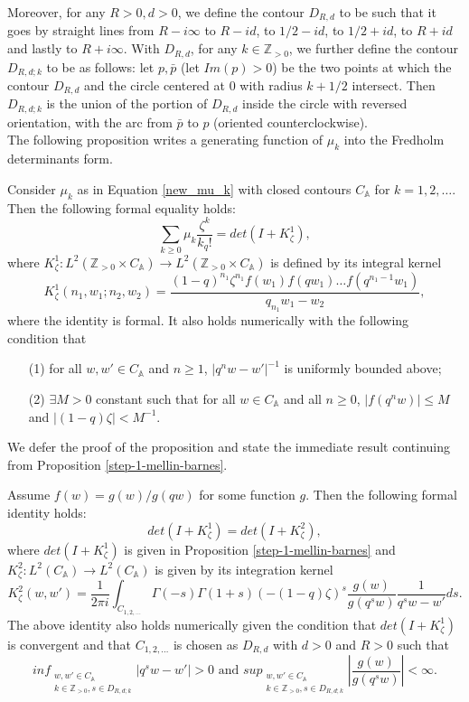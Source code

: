 Moreover, for any $R > 0, d > 0$, we define the contour $D_{R,d}$ to be such that it goes by straight lines from $R - i\infty$ to $R - i d$, to $1/2 - i d$, to $1/2 + id$, to $R + id$ and lastly to $R+i\infty$. With $D_{R,d}$, for any $k \in \mathbb{Z}_{>0}$, we further define the contour $D_{R,d;k}$ to be as follows: let $p, \bar{p}$ (let $Im(p) > 0$) be the two points at which the contour $D_{R,d}$ and the circle centered at 0 with radius $k+1/2$ intersect. Then $D_{R,d;k}$ is the union of the portion of $D_{R,d}$ inside the circle with reversed orientation, with the arc from $\bar{p}$ to $p$ (oriented counterclockwise). \\

The following proposition writes a generating function of $\mu_k$ into the Fredholm determinants form.
\begin{proposition}
\label{step-1-mellin-barnes}
Consider $\mu_k$ as in Equation \ref{new_mu_k} with closed contours $C_{\mathbb{A}}$ for $k = 1,2,\dots$. Then the following formal equality holds:
$$\sum_{k \ge 0} \mu_k \frac{\zeta^k}{k_q!} = det(I+K_{\zeta}^{1}),$$ where $K_{\zeta}^1:L^2(\mathbb{Z}_{>0} \times C_{\mathbb{A}}) \rightarrow L^2(\mathbb{Z}_{>0} \times C_{\mathbb{A}})$ is defined by its integral kernel $$K_{\zeta}^1(n_1, w_1; n_2, w_2)= \frac{(1-q)^{n_1} \zeta^{n_1} f(w_1) f(qw_1) \dots f(q^{n_1-1}w_1)}{q_{n_1}w_1 - w_2},$$
where the identity is formal. It also holds numerically with the following condition that
\begin{enumerate}
\item[(1)] for all $w, w' \in C_{\mathbb{A}}$ and $n \ge 1$, $|q^n w - w'|^{-1}$ is uniformly bounded above;
\item[(2)] $\exists M > 0$ constant such that for all $w \in C_{\mathbb{A}}$ and all $n \ge 0$, $|f(q^n w)| \le M$ and $|(1-q) \zeta| < M^{-1}$.
\end{enumerate}
\end{proposition}

We defer the proof of the proposition and state the immediate result continuing from Proposition \ref{step-1-mellin-barnes}.

\begin{proposition}
\label{step-2-mellin-barnes}
Assume $f(w) = g(w) / g(qw)$ for some function $g$. Then the following formal identity holds:
$$det(I+K_{\zeta}^1) = det(I+K_{\zeta}^2),$$ where $det(I+K_{\zeta}^1)$ is given in Proposition \ref{step-1-mellin-barnes} and $K_{\zeta}^2:L^2(C_{\mathbb{A}}) \rightarrow L^2(C_{\mathbb{A}})$ is given by its integration kernel $$K_{\zeta}^2(w,w') = \frac{1}{2 \pi i} \int_{C_{1,2,\dots}} \Gamma(-s) \Gamma(1+s) (-(1-q)\zeta)^s \frac{g(w)}{g(q^sw)} \frac{1}{q^sw - w'} ds.$$
The above identity also holds numerically given the condition that $det(I+K_{\zeta}^1)$ is convergent and that $C_{1,2,\dots}$ is chosen as $D_{R,d}$ with $d > 0$ and $R > 0$ such that $$ inf_{\substack{ {w, w' \in C_{\mathbb{A}}} \\ {k \in \mathbb{Z}_{>0}, s \in D_{R, d;k}} }} |q^sw - w'| > 0 \text{ and } sup_{\substack{ {w,w' \in C_{\mathbb{A}}} \\ {k \in \mathbb{Z}_{>0}, s \in D_{R,d;k}} }} \left| \frac{g(w)}{g(q^s w)} \right| < \infty.$$
\end{proposition}

